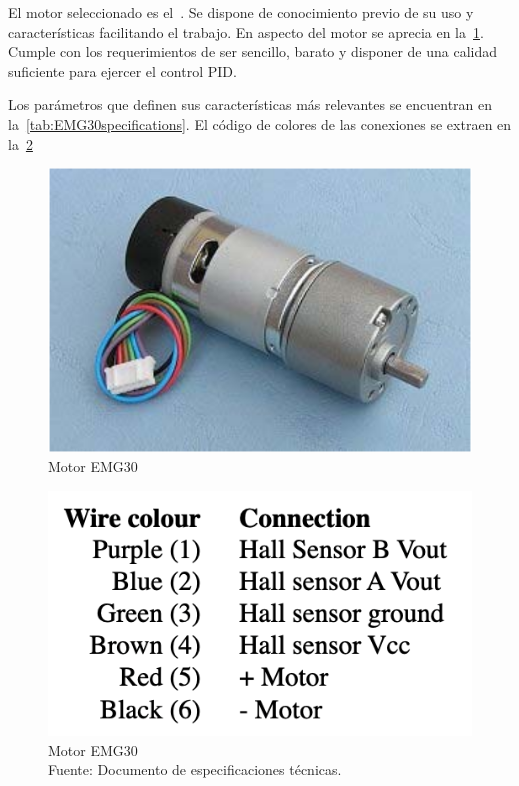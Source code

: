 
El motor seleccionado es el~\cite{EMG30datasheet}.
Se dispone de conocimiento previo de su uso y características facilitando el trabajo.
En aspecto del motor se aprecia en la~\cref{fig:EMG Motor}.
Cumple con los requerimientos de ser sencillo, barato y disponer de una calidad suficiente para ejercer el control PID.

Los parámetros que definen sus características más relevantes se encuentran en la~\cref{tab:EMG30specifications}.
El código de colores de las conexiones se extraen en la~\cref{fig:motor connection}

\begin{figure}[H]
    \centering
    \includegraphics[scale = 0.35]{part/Proyecto_ejecutivo/memoria_constructiva/motor/img/MotorEMG30}
    \caption{Motor EMG30\cite{EMG30datasheet}}\label{fig:EMG Motor}
\end{figure}

\begin{figure}[H]
    \centering
    \includegraphics[scale = 0.5]{part/Proyecto_ejecutivo/memoria_constructiva/motor/img/motorConnection}
    \caption{Motor EMG30 \\Fuente: Documento de especificaciones técnicas.\cite{EMG30datasheet}}\label{fig:motor connection}
\end{figure}

